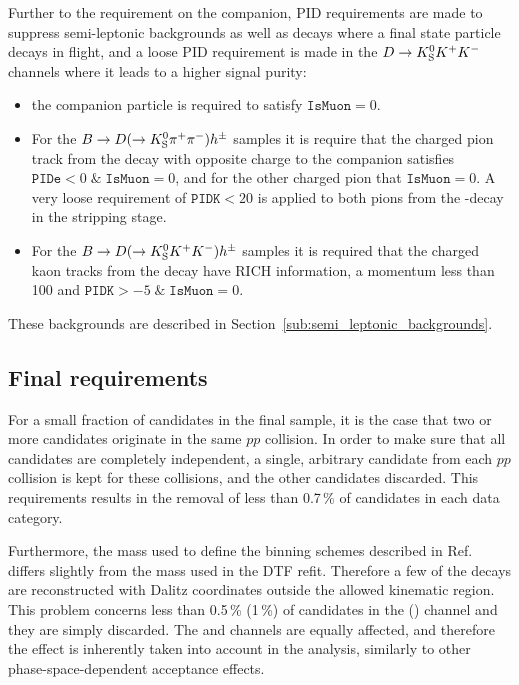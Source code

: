 Further to the requirement on the companion, PID requirements are made to suppress semi-leptonic backgrounds as well as decays where a final state particle decays in flight, and a loose PID requirement is made in the ${D}\rightarrow{\ensuremath{{K}^0_{\mathrm{S}}}}{\ensuremath{{K}^+}}{\ensuremath{{K}^-}}$ channels where it leads to a higher signal purity:
\begin{itemize}
    \item the companion particle is required to satisfy $\texttt{IsMuon}=0$.
    \item For the ${B}\rightarrow{\ensuremath{D}}(\rightarrow{\ensuremath{{K}^0_{\mathrm{S}}}}{\ensuremath{{\pi}^+}}{\ensuremath{{\pi}^-}})h^{\pm}$ samples it is require that the charged pion track from the \D decay with opposite charge to the companion satisfies ${\texttt{PIDe} < 0 \;\&\; \texttt{IsMuon}=0}$, and for the other charged pion that ${\texttt{IsMuon}=0}$. A very loose requirement of $\texttt{PIDK} < 20$ is applied to both pions from the \D-decay in the stripping stage.
    \item For the ${B}\rightarrow{\ensuremath{D}}(\rightarrow{\ensuremath{{K}^0_{\mathrm{S}}}}{\ensuremath{{K}^+}}{\ensuremath{{K}^-}})h^{\pm}$ samples it is required that the charged kaon tracks from the \D decay have RICH information, a momentum less than 100 \gevc and ${\texttt{PIDK} > -5 \;\&\; \texttt{IsMuon}=0}$.
\end{itemize}
These backgrounds are described in Section~\ref{sub:semi_leptonic_backgrounds}.



\subsection{Final requirements} %
\label{sub:final_requirements}

For a small fraction of candidates in the final sample, it is the case that two or more candidates originate in the same $pp$ collision. In order to make sure that all candidates are completely independent, a single, arbitrary candidate from each $pp$ collision is kept for these collisions, and the other candidates discarded. This requirements results in the removal of less than 0.7\,\% of candidates in each data category.

Furthermore, the \D mass used to define the binning schemes described in Ref.~\cite{CLEOCISI} differs slightly from the mass used in the DTF refit. Therefore a few of the decays are reconstructed with Dalitz coordinates outside the allowed kinematic region. This problem concerns less than 0.5\,\% (1\,\%) of candidates in the \DtoKspp (\DtoKskk) channel and they are simply discarded. The \BtoDK and \BtoDpi channels are equally affected, and therefore the effect is inherently taken into account in the analysis, similarly to other phase-space-dependent acceptance effects.

